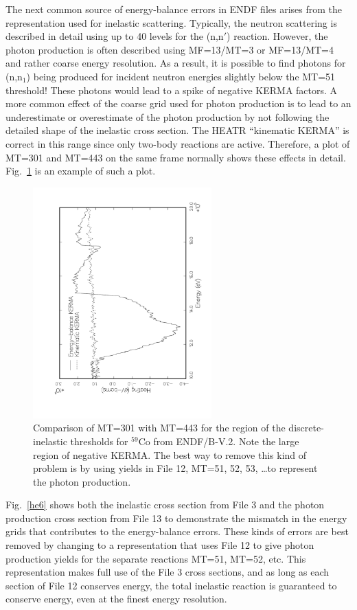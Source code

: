 The next common source of energy-balance errors in ENDF files
arises from the representation used for inelastic scattering.
Typically, the neutron scattering is described in detail using
up to 40 levels for the (n,n$'$) reaction.  However, the photon
production is often described using MF=13/MT=3 or MF=13/MT=4 and
rather coarse energy resolution.  As a result, it is possible
to find photons for (n,n$_1$) being produced for incident
neutron energies slightly below the MT=51 threshold!  These
photons would lead to a spike of negative KERMA factors.  A
more common effect of the coarse grid used for photon production
is to lead to an underestimate or overestimate of the photon
production by not following the detailed shape of the inelastic
cross section.  The HEATR ``kinematic KERMA'' is correct in
this range since only two-body reactions are active.  Therefore,
a plot of MT=301 and MT=443 on the same frame normally shows
these effects in detail.  Fig.~\ref{he5} is an example of such
a plot.

\begin{figure}[b]\centering
\includegraphics[keepaspectratio,height=3.5in, angle=270]{figs/heatr5ack}
\caption[MT301 and MT443 for $^{59}$Co]{Comparison of MT=301 with
 MT=443 for the region of the discrete-inelastic thresholds for $^{59}$Co
 from ENDF/B-V.2.  Note the large region of negative KERMA.  The best way
 to remove this kind of problem is by using yields in File 12, MT=51, 52, 53,
 \ldots to represent the photon production.}
\label{he5}
\end{figure}

Fig.~\ref{he6} shows both the inelastic cross section
from File 3 and the photon production cross section from File 13
to demonstrate the mismatch in the energy grids that contributes
to the energy-balance errors.  These kinds of errors are best
removed by changing to a representation that uses File 12 to
give photon production yields for the separate reactions MT=51,
MT=52, etc.  This representation makes full use of the File 3
cross sections, and as long as each section of File 12
conserves energy, the total inelastic reaction is guaranteed to
conserve energy, even at the finest energy resolution.

